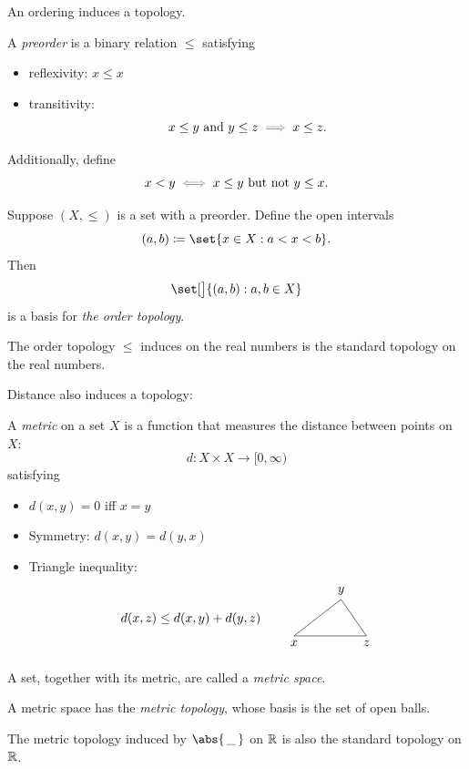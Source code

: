 \documentclass[a5paper]{scrbook}
\let\oldimplies\implies
\def\implies{\color{gray}\oldimplies\color{black}}
\let\oldiff\iff
\def\iff{\color{gray}\oldiff\color{black}}
\begin{document}
  An ordering induces a topology. 
  \begin{defn}[preorder]
    A \emph{preorder} is a binary relation \(\leq\) satisfying
    \begin{itemize}
      \item reflexivity: \(x\leq x\)
      \item transitivity:
            \[
            x\leq y \text{ and } y\leq z \implies x\leq z. 
            \]
    \end{itemize}
    Additionally, define
    \[
      x < y \iff x \leq y \text{ but not } y \leq x. 
    \]
  \end{defn}
  \begin{defn}
    Suppose \((X,\leq)\) is a set with a preorder. Define the open intervals
    \[
      (a,b) \define \set{x\in X: a < x < b}. 
    \]
    Then
    \[
      \set[\big]{(a,b) : a,b \in X}
    \]
    is a basis for \emph{the order topology}. 
  \end{defn}
  The order topology \(\leq\) induces on the real numbers is the standard topology on the real numbers. 

  Distance also induces a topology:
  \begin{defn}
    A \emph{metric} on a set \(X\) is a function that measures the distance between points on \(X\):
    \[
      d: X \times X \to [0,\infty)
    \]
    satisfying 
    \begin{itemize}
      \item \(d(x,y)=0\) iff \(x=y\)
      \item Symmetry: \(d(x,y) = d(y,x)\)
      \item Triangle inequality:
            \[
            d(x,z) \leq d(x,y) + d(y,z) 
            \qquad
            \begin{matrix}
              \begin{tikzpicture}
                \draw (0,0) coordinate[label=below:\(x\)] -- (2,0) coordinate[label=below:\(z\)] -- (1.3,1) coordinate[label=\(y\)] -- cycle;
              \end{tikzpicture}
            \end{matrix}
            \]
    \end{itemize}
    A set, together with its metric, are called a \emph{metric space}. 
  \end{defn}
  \begin{defn}
    A metric space has the \emph{metric topology}, whose basis is the set of open balls. 
  \end{defn}
  The metric topology induced by \(\abs{\,\_\,}\) on \(\mathbb{R}\) is also the standard topology on \(\mathbb{R}\). 
\end{document}
